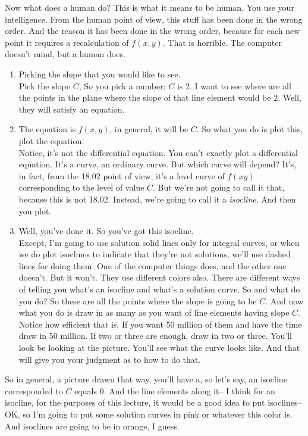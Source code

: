 Now what does a human do?
This is what it means to be human.
You use your intelligence.
From the human point of view, this stuff has been done in the wrong order.
And the reason it has been done in the wrong order,
because for each new point it requires a recalculation of $f(x,y)$.
That is horrible.
The computer doesn't mind, but a human does.
\begin{enumerate}
\item Picking the slope that you would like to see.\\
  Pick the slope $C$,  So you pick a number; $C$ is $2$.
  I want to see where are all the points in the plane where
  the slope of that line element would be $2$.
  Well, they will satisfy an equation.
\item The equation is $f(x, y)$, in general, it will be $C$.
  So what you do is plot this, plot the equation. \\
  Notice, it's not the differential equation.
  You can't exactly plot a differential equation.
  It's a curve, an ordinary curve.  But which curve will depend?
  It's, in fact, from the 18.02 point of view,  it's a level curve of
  $f(x y)$ corresponding to the level of value $C$.
  But we're not going to call it that, because this is not 18.02.
  Instead, we're going to call it a \textit{isocline}.
  And then you plot.
\item Well, you've done it. So you've got this isocline.\\
  Except, I'm going to use solution solid lines only
  for integral curves, or when we do plot isoclines to indicate
  that they're not solutions, we'll use dashed lines for doing them.
  One of the computer things does, and the other one doesn't.
  But it won't. They use different colors also.
  There are different ways of telling you what's an isocline
  and what's a solution curve.
  So and what do you do?
  So these are all the points where the slope is going to be $C$. And now
  what you do is draw in as many as you want of line elements having slope $C$.
  Notice how efficient that is. If you want 50 million of them and have the time
  draw in 50 million.
  If two or three are enough, draw in two or three.
  You'll look be looking at the picture.
  You'll see what the curve looks like.
  And that will give you your judgment as to how to do that.

\end{enumerate}

So in general, a picture drawn that way,
you'll have a, so let's say, an isocline corresponded to $C$ equals $0$.
And the line elements along it--
I think for an isocline, for the purposes of this lecture,
it would be a good idea to put isoclines--
OK, so I'm going to put some solution curves in pink or whatever this color is.
And isoclines are going to be in orange, I guess.

